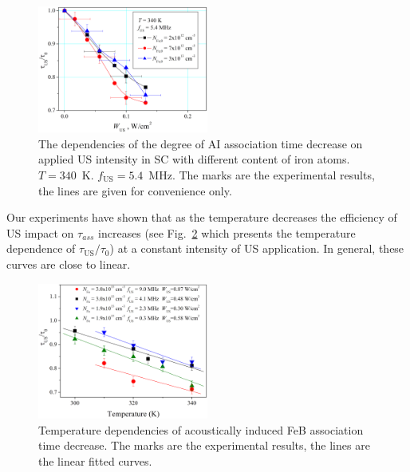 \documentclass[sn-mathphys]{sn-jnl}%
\theoremstyle{thmstyleone}%
\theoremstyle{thmstyletwo}%
\theoremstyle{thmstylethree}%
\begin{document}
\begin{figure}
\centering
 \includegraphics[width=0.5\textwidth]{Fig5}
\caption{
The dependencies of the degree of AI association time decrease on applied US intensity
in SC with different content of iron atoms.
$T=340$~K.
$f_\mathrm{US}=5.4$~MHz.
The marks are the experimental results, the lines are given for convenience only.
}
\label{figNFe}       %
\end{figure}

Our experiments have shown that
as the temperature decreases the efficiency of US impact on $\tau_{ass}$ increases
(see Fig.~\ref{figTemp} which presents the temperature dependence of $\tau_\mathrm{US}/\tau_{0}$)
at a constant intensity of US application.
In general, these curves are close to linear.

\begin{figure}
\centering
 \includegraphics[width=0.5\textwidth]{Fig6}
\caption{
Temperature dependencies of  acoustically induced FeB association time decrease.
The marks are the experimental results, the lines are the linear fitted curves.
}
\label{figTemp}       %
\end{figure}
\end{document}
